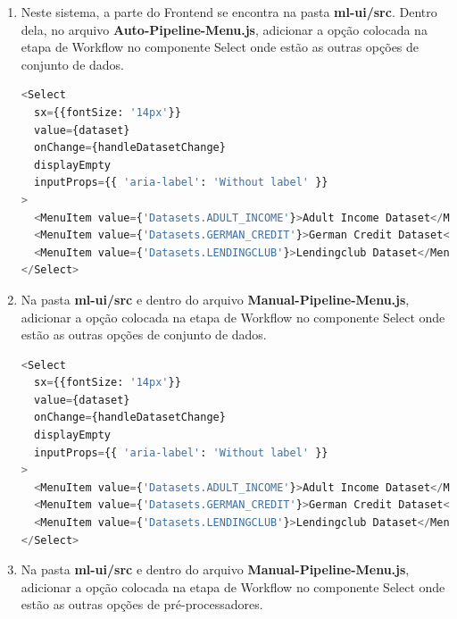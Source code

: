 \documentclass[portugues]{ic-tese}
\begin{document}
\begin{enumerate}
\item Neste sistema, a parte do Frontend se encontra na pasta \textbf{ml-ui/src}. Dentro dela, no arquivo \textbf{Auto-Pipeline-Menu.js}, adicionar a opção colocada na etapa de Workflow no componente Select onde estão as outras opções de conjunto de dados.

\begin{lstlisting}[language=Python, label=cod:AddDatasetAuto]
<Select
  sx={{fontSize: '14px'}}
  value={dataset}
  onChange={handleDatasetChange}
  displayEmpty
  inputProps={{ 'aria-label': 'Without label' }}
>
  <MenuItem value={'Datasets.ADULT_INCOME'}>Adult Income Dataset</MenuItem>
  <MenuItem value={'Datasets.GERMAN_CREDIT'}>German Credit Dataset</MenuItem>
  <MenuItem value={'Datasets.LENDINGCLUB'}>Lendingclub Dataset</MenuItem>
</Select>
\end{lstlisting}

\item Na pasta \textbf{ml-ui/src} e dentro do arquivo \textbf{Manual-Pipeline-Menu.js}, adicionar a opção colocada na etapa de Workflow no componente Select onde estão as outras opções de conjunto de dados.

\begin{lstlisting}[language=Python, label=cod:AddDatasetManual]
<Select
  sx={{fontSize: '14px'}}
  value={dataset}
  onChange={handleDatasetChange}
  displayEmpty
  inputProps={{ 'aria-label': 'Without label' }}
>
  <MenuItem value={'Datasets.ADULT_INCOME'}>Adult Income Dataset</MenuItem>
  <MenuItem value={'Datasets.GERMAN_CREDIT'}>German Credit Dataset</MenuItem>
  <MenuItem value={'Datasets.LENDINGCLUB'}>Lendingclub Dataset</MenuItem>
</Select>
\end{lstlisting}

\item Na pasta \textbf{ml-ui/src} e dentro do arquivo \textbf{Manual-Pipeline-Menu.js}, adicionar a opção colocada na etapa de Workflow no componente Select onde estão as outras opções de pré-processadores.


\end{enumerate}
\end{document}
